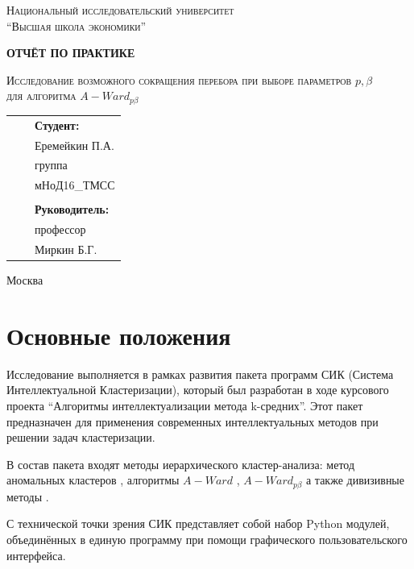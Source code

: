 \documentclass[12pt,twoside,a4paper,tikz,border=5]{refart}
\begin{document}
	\begin{titlepage}
		\centering
		{\scshape\small Национальный исследовательский университет \\
			``Высшая школа экономики'' \par}
		\vspace{2cm}
		{\Huge\bfseries ОТЧЁТ ПО ПРАКТИКЕ\par}
		\vspace{2cm}
		{\scshape\Large Исследование возможного сокращения перебора при выборе параметров $ p, \beta $ \\
			для алгоритма $ A-Ward_{p\beta}$ \par}
		\vspace{1.5cm}
				
		\vfill
		\begin{center}
			\begin{tabular}{  p{7cm}  p{4cm} p{5cm}  } 
				& & \textbf{Студент:}\\ 
				& & Еремейкин П.А. \\ 
				& & группа \\
				& & мНоД16\_ТМСС\\
				& & \\
				& & \textbf{Руководитель: }\\
				& & профессор\\
				& & Миркин Б.Г.\\
			\end{tabular}
		\end{center}
		\vfill
		{Москва \the\year\par}
	\end{titlepage}


	\tableofcontents 
	\newpage
	\section{Основные положения}
		Исследование выполняется в рамках развития пакета программ СИК (Система Интеллектуальной Кластеризации), который был разработан в ходе курсового проекта ``Алгоритмы интеллектуализации метода k-средних''. Этот пакет предназначен для применения современных интеллектуальных методов при решении задач кластеризации. 
		
		В состав пакета входят методы иерархического кластер-анализа: метод аномальных кластеров \cite{anomal-clustering}, алгоритмы $ A-Ward $ , $ A-Ward_{p\beta} $ \cite{a-ward-pb} а также дивизивные методы \cite{kovaleva}. 
		
		С технической точки зрения СИК представляет собой набор Python модулей, объединённых в единую программу при помощи графического пользовательского интерфейса.  
		
\end{document}
